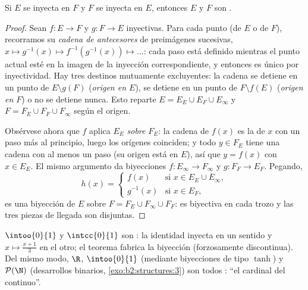 \begin{theorem}\label{thm:b2:structures:cantorbernstein}
Si $E$ se inyecta en $F$ y $F$ se inyecta en $E$, entonces $E$ y $F$
son .
\end{theorem}

\begin{proof}
Sean $f \colon E \to F$ y $g \colon F \to E$ inyectivas. Para cada
punto (de $E$ o de $F$), recorramos su \emph{cadena de antecesores}
de preimágenes sucesivas, $x \mapsto g^{-1}(x) \mapsto
f^{-1}(g^{-1}(x)) \mapsto \dots$: cada paso está definido mientras el
punto actual esté en la imagen de la inyección correspondiente, y
entonces es único por inyectividad. Hay tres destinos mutuamente
excluyentes: la cadena se detiene en un punto de $E \setminus g(F)$
(\emph{origen en $E$}), se detiene en un punto de $F \setminus f(E)$
(\emph{origen en $F$}) o no se detiene nunca. Esto reparte $E = E_E
\cup E_F \cup E_\infty$ y $F = F_E \cup F_F \cup F_\infty$ según el
origen.

Obsérvese ahora que $f$ aplica $E_E$ \emph{sobre} $F_E$: la cadena de
$f(x)$ es la de $x$ con un paso más al principio, luego los orígenes
coinciden; y todo $y \in F_E$ tiene una cadena con al menos un paso
(su origen está en $E$), así que $y = f(x)$ con $x \in E_E$. El mismo
argumento da biyecciones $f \colon E_\infty \to F_\infty$ y $g \colon
F_F \to E_F$. Pegando,
\[
h(x) =
\begin{cases}
f(x) & \text{si } x \in E_E \cup E_\infty,\\
g^{-1}(x) & \text{si } x \in E_F,
\end{cases}
\]
es una biyección de $E$ sobre $F = F_E \cup F_\infty \cup F_F$: es
biyectiva en cada trozo y las tres piezas de llegada son disjuntas.
\end{proof}

\begin{example}\label{ex:b2:structures:cbexample}
$\intoo{0}{1}$ y $\intcc{0}{1}$ son : la identidad inyecta
en un sentido y $x \mapsto \frac{x + 1}{3}$ en el otro; el teorema
fabrica la biyección (forzosamente discontinua). Del mismo modo,
$\R$, $\intoo{0}{1}$ (mediante biyecciones de tipo $\tanh$) y
$\mathcal{P}(\N)$ (desarrollos binarios, \cref{exo:b2:structures:3})
son todos : ``el cardinal del continuo''.
\end{example}

